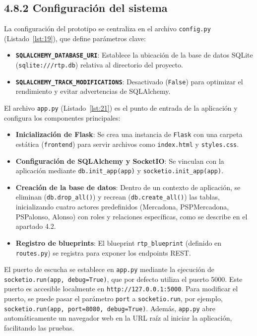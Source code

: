 \subsection*{4.8.2 \; Configuración del sistema}

La configuración del prototipo se centraliza en el archivo \texttt{config.py} (Listado~\ref{lst:19}), que define parámetros clave:

\begin{itemize}
    \item \textbf{\texttt{SQLALCHEMY\_DATABASE\_URI}}: Establece la ubicación de la base de datos SQLite (\texttt{sqlite:///rtp.db}) relativa al directorio del proyecto.
    \item \textbf{\texttt{SQLALCHEMY\_TRACK\_MODIFICATIONS}}: Desactivado (\texttt{False}) para optimizar el rendimiento y evitar advertencias de SQLAlchemy.
\end{itemize}

El archivo \texttt{app.py} (Listado~\ref{lst:21}) es el punto de entrada de la aplicación y configura los componentes principales:

\begin{itemize}
    \item \textbf{Inicialización de Flask}: Se crea una instancia de \texttt{Flask} con una carpeta estática (\texttt{frontend}) para servir archivos como \texttt{index.html} y \texttt{styles.css}.
    \item \textbf{Configuración de SQLAlchemy y SocketIO}: Se vinculan con la aplicación mediante \texttt{db.init\_app(app)} y \texttt{socketio.init\_app(app)}.
    \item \textbf{Creación de la base de datos}: Dentro de un contexto de aplicación, se eliminan (\texttt{db.drop\_all()}) y recrean (\texttt{db.create\_all()}) las tablas, inicializando cuatro actores predefinidos (Mercadona, PSPMercadona, PSPalonso, Alonso) con roles y relaciones específicas, como se describe en el apartado 4.2.
    \item \textbf{Registro de blueprints}: El blueprint \texttt{rtp\_blueprint} (definido en \texttt{routes.py}) se registra para exponer los endpoints REST.
\end{itemize}

El puerto de escucha se establece en \texttt{app.py} mediante la ejecución de \texttt{socketio.run(app, debug=True)}, que por defecto utiliza el puerto 5000. Este puerto es accesible localmente en \texttt{http://127.0.0.1:5000}. Para modificar el puerto, se puede pasar el parámetro \texttt{port} a \texttt{socketio.run}, por ejemplo, \texttt{socketio.run(app, port=8080, debug=True)}. Además, \texttt{app.py} abre automáticamente un navegador web en la URL raíz al iniciar la aplicación, facilitando las pruebas.


